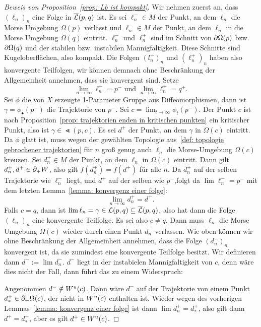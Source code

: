 \begin{proof}[Beweis von Proposition~\ref{prop: Lb ist kompakt}]
    Wir nehmen zuerst an, dass $(\ell_n)_n$ eine Folge in ${\overline{\mathcal{L}} } (p, q)$ ist.
    Es sei $\ell_n^- \in M$ der Punkt, an dem $\ell_n$ die Morse Umgebung $\Omega(p)$ verlässt 
    und $\ell_n^- \in M$ der Punkt, an dem $\ell_n$ in die Morse Umgebung $\Omega(q)$ eintritt.
    $\ell_n^-$ und $\ell_n^+$ sind im Schnitt von ${ \partial } \Omega (p)$ bzw. ${ \partial } \Omega (q)$ und 
    der stabilen bzw. instabilen Mannigfaltigkeit. Diese Schnitte sind Kugeloberflächen, also 
    kompakt. Die Folgen $(l_n^-)_n$ und $(\ell_n^+)_n$ haben also konvergente Teilfolgen, wir können 
    demnach ohne Beschränkung der Allgemeinheit annehmen, dass sie konvergent sind. Setze
    \[ \lim_{n \to \infty} \ell_n^- = p^- \text{ und } \lim_{n \to \infty} \ell_n^+ = q^+ . \]
    Sei $\phi$ die von $X$ erzeugte 1-Parameter Gruppe aus Diffeomorphismen, dann ist 
    $\gamma = \phi_{\bullet}(p^-)$ die Trajektorie von $p^-$. Sei 
    $c = \lim_{t \to \infty} \phi_t(p^-)$. Der Punkt $c$ ist nach 
    Proposition~\ref{prop: trajektorien enden in kritischen punkten} ein kritischer Punkt,
    also ist $\gamma \in \Lt (p, c)$.  Es sei $d^+$ der Punkt, an dem $\gamma$ in $\Omega (c)$ 
    eintritt. Da $\phi$ glatt ist, muss wegen der gewählten Topologie 
    aus~\ref{def: topologie gebrochener trajektorien} für $n$ groß genug auch $\ell_n$ die 
    Morse-Umgebung $\Omega (c)$ kreuzen. Sei $d_n^+ \in M$ der Punkt, an dem $\ell_n$ in 
    $\Omega (c)$ eintritt. 
    Dann gilt $d_n^+, d^+ \in { \partial }_+ W$, also gilt $f(d_n^+) = f(d^+)$ für alle $n$. Da $d_n^+$ auf 
    der selben Trajektorie wie $\ell_n^-$ liegt, und $d^+$ auf der selben wie $p^-$,folgt da 
    $\lim \ell_n^- = p^-$ mit dem letzten Lemma~\ref{lemma: konvergenz einer folge}: 
    \[ \lim_{n \to \infty} d_n^+ = d^+ . \]
    Falls $c = q$, dann ist $\lim \ell_n = \gamma \in { \mathcal{L} } (p, q) \subseteq {\overline{\mathcal{L}} } (p, q)$, also hat 
    dann die Folge $(\ell_n)_n$ eine konvergente Teilfolge. Es sei also $c \neq q$. Dann muss 
    $\ell_n$ die Morse Umgebung $\Omega (c)$ wieder durch einen Punkt $d_n^-$ verlassen. Wie oben 
    können wir ohne Beschränkung der Allgemeinheit annehmen, dass die Folge $(d_n^-)_n$ konvergent 
    ist, da sie zumindest eine konvergente Teilfolge besitzt. Wir definieren dann $d^- := \lim d_n^-$. 
    $d^-$ liegt in der instabielen Mannigfaltigkeit von $c$, denn wäre dies nicht der Fall, dann 
    führt das zu einem Widerspruch:
    
    Angenommen $d^- \notin { W^u } (c)$. Dann wäre $d^-$ auf der Trajektorie von einem Punkt
    $d^+_{\ast} \in { \partial }_+ \Omega (c)$, der nicht in ${ W^u } (c)$ enthalten ist. Wieder wegen des 
    vorherigen Lemmas~\ref{lemma: konvergenz einer folge} ist dann $\lim d_n^+ = d^+_{\ast}$, also 
    gilt dann $d^+ = d^+_{\ast}$, aber es gilt $d^+ \in { W^u } (c)$.
    

\end{proof}
